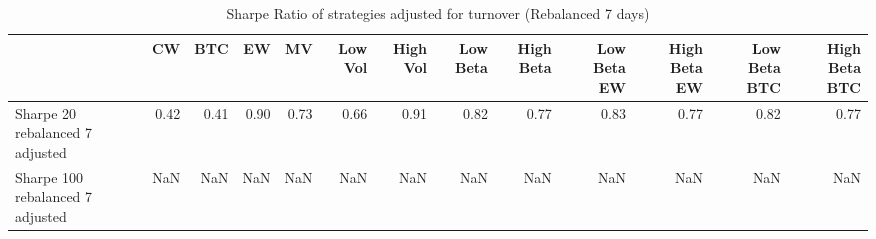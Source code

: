 \begin{table}
\centering
\caption{Sharpe Ratio of strategies adjusted for turnover (Rebalanced 7 days)}
\label{sharpe7}
\begin{tabular}{lrrrrrrrrrrrr}
\toprule
{} &   CW &  BTC &   EW &   MV &  Low Vol &  High Vol &  Low Beta &  High Beta &  Low Beta EW &  High Beta EW &  Low Beta BTC &  High Beta BTC \\
\midrule
Sharpe 20 rebalanced 7 adjusted  & 0.42 & 0.41 & 0.90 & 0.73 &     0.66 &      0.91 &      0.82 &       0.77 &         0.83 &          0.77 &          0.82 &           0.77 \\
Sharpe 100 rebalanced 7 adjusted &  NaN &  NaN &  NaN &  NaN &      NaN &       NaN &       NaN &        NaN &          NaN &           NaN &           NaN &            NaN \\
\bottomrule
\end{tabular}
\end{table}
